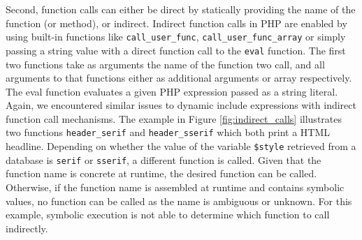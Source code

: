 \documentclass[sigconf]{acmart}
\renewcommand{\tt}[1]{\texttt{#1}}
\begin{document}
Second, function calls can either be direct by statically providing the name of
the function (or method), or indirect. Indirect function calls in PHP are
enabled by using built-in functions like \tt{call\_user\_func},
\tt{call\_user\_func\_array} or simply passing a string value with a direct
function call to the \tt{eval} function. The first two functions take as
arguments the name of the function two call, and all arguments to that functions either as additional arguments or
array respectively. The eval function evaluates a given PHP expression passed
as a string literal.
Again, we encountered similar issues to dynamic include expressions with
indirect function call mechanisms. The example in Figure
\ref{fig:indirect_calls} illustrates two functions \tt{header\_serif} and
\tt{header\_sserif} which both print a HTML headline. Depending on whether the
value of the variable \tt{\$style} retrieved from a database is \tt{serif} or
\tt{sserif}, a different function is called. Given that the function name is 
concrete at runtime, the desired function can be called. Otherwise, if the
function name is assembled at runtime and contains symbolic values, no function
can be called as the name is ambiguous or unknown. For this example, symbolic
execution is not able to determine which function to call indirectly.
\end{document}
